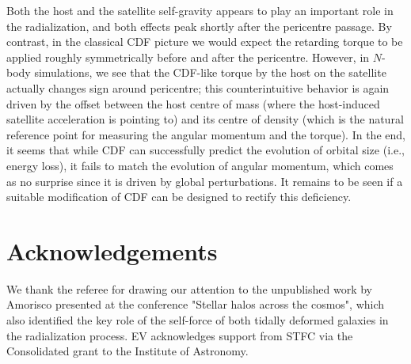\documentclass[twocolumn]{aastex63}
\begin{document}
Both the host and the satellite self-gravity appears to play an important role in the radialization, and both effects peak shortly after the pericentre passage. By contrast, in the classical CDF picture we would expect the retarding torque to be applied roughly symmetrically before and after the pericentre. However, in $N$-body simulations, we see that the CDF-like torque by the host on the satellite actually changes sign around pericentre; this counterintuitive behavior is again driven by the offset between the host centre of mass (where the host-induced satellite acceleration is pointing to) and its centre of density (which is the natural reference point for measuring the angular momentum and the torque). In the end, it seems that while CDF can successfully predict the evolution of orbital size (i.e., energy loss), it fails to match the evolution of angular momentum, which comes as no surprise since it is driven by global perturbations. It remains to be seen if a suitable modification of CDF can be designed to rectify this deficiency.

\section*{Acknowledgements}
We thank the referee for drawing our attention to the unpublished work by Amorisco presented at the conference "Stellar halos across the cosmos", which also identified the key role of the self-force of both tidally deformed galaxies in the radialization process. EV acknowledges support from STFC via the Consolidated grant to the Institute of Astronomy.
\end{document}
